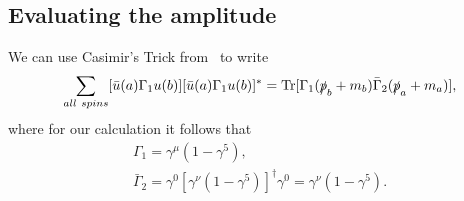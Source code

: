 \subsection{Evaluating the amplitude}
We can use Casimir's Trick from~\cite{griffiths:2004:introduction} to write
\begin{equation}\label{eq:casimir}
\sum_{all\ spins}[\bar{u}(a)\Gamma _1 u(b)][\bar{u}(a)\Gamma _1 u(b)]^*=\mathrm{Tr}[\Gamma _1 (\slashed{p}_b+m_b)\bar{\Gamma}_2(\slashed{p}_a+m_a)],
\end{equation} 
where for our calculation it follows that
\begin{gather}
\Gamma _1=\gamma ^{\mu}(1-\gamma ^5),\label{eq:gamma1} \\
\bar{\Gamma} _2 = \gamma ^0[\gamma ^{\nu}(1-\gamma ^5)]^\dagger \gamma ^0= \gamma ^{\nu}(1-\gamma ^5). \label{eq:gamma2}
\end{gather}

